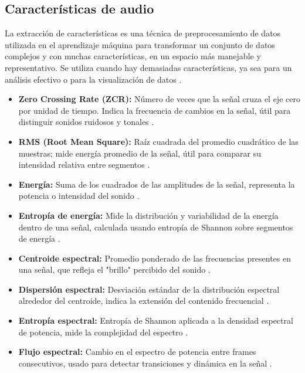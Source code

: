 \subsection{Características de audio}
La extracción de características es una técnica de preprocesamiento de datos utilizada en el aprendizaje máquina para transformar un conjunto de datos complejos y con muchas características, en un espacio más manejable y representativo. Se utiliza cuando hay demasiadas características, ya sea para un análisis efectivo o para la visualización de datos \cite{richer_coelho_2013}.


\begin{itemize}
  \item \textbf{Zero Crossing Rate (ZCR):} Número de veces que la señal cruza el eje cero por unidad de tiempo. Indica la frecuencia de cambios en la señal, útil para distinguir sonidos ruidosos y tonales \cite{muller2015fmp}.

  \item \textbf{RMS (Root Mean Square):} Raíz cuadrada del promedio cuadrático de las muestras; mide energía promedio de la señal, útil para comparar su intensidad relativa entre segmentos \cite{sound_quality_heyboer2010}.

  \item \textbf{Energía:} Suma de los cuadrados de las amplitudes de la señal, representa la potencia o intensidad del sonido \cite{rabiner2010fundamentals}.

  \item \textbf{Entropía de energía:} Mide la distribución y variabilidad de la energía dentro de una señal, calculada usando entropía de Shannon sobre segmentos de energía \cite{li2017audio}.

  \item \textbf{Centroide espectral:} Promedio ponderado de las frecuencias presentes en una señal, que refleja el "brillo" percibido del sonido \cite{peeters2004large}.

  \item \textbf{Dispersión espectral:} Desviación estándar de la distribución espectral alrededor del centroide, indica la extensión del contenido frecuencial \cite{peeters2004large}.

  \item \textbf{Entropía espectral:} Entropía de Shannon aplicada a la densidad espectral de potencia, mide la complejidad del espectro \cite{jiang2011spectral}.

  \item \textbf{Flujo espectral:} Cambio en el espectro de potencia entre frames consecutivos, usado para detectar transiciones y dinámica en la señal \cite{foote2000novelty}.


\end{itemize}
